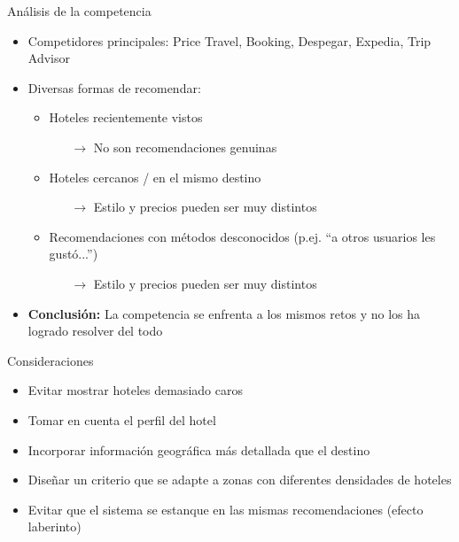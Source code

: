 \documentclass{beamer}
\begin{document}
\begin{frame}{Análisis de la competencia}
	\begin{itemize}%
		\item Competidores principales: Price Travel, Booking, Despegar, Expedia, Trip Advisor
		\item Diversas formas de recomendar:
		\begin{itemize}
			\item Hoteles recientemente vistos
			\begin{itemize}
				\item[$\rightarrow$] No son recomendaciones genuinas
			\end{itemize}
			\item Hoteles cercanos / en el mismo destino
			\begin{itemize}
				\item[$\rightarrow$] Estilo y precios pueden ser muy distintos
			\end{itemize}
			\item Recomendaciones con métodos desconocidos (p.ej. ``a otros usuarios les gustó...'')
			\begin{itemize}
				\item[$\rightarrow$] Estilo y precios pueden ser muy distintos
			\end{itemize}
		\end{itemize}
	\item \textbf{Conclusión:} La competencia se enfrenta a los mismos retos y no los ha logrado resolver del todo
	\end{itemize}
\end{frame}

\begin{frame}{Consideraciones}
	\begin{itemize}%
		\item Evitar mostrar hoteles demasiado caros
		\item Tomar en cuenta el perfil del hotel
		\item Incorporar información geográfica más detallada que el destino
		\item Diseñar un criterio que se adapte a zonas con diferentes densidades de hoteles
		\item Evitar que el sistema se estanque en las mismas recomendaciones (efecto laberinto)
	\end{itemize}
\end{frame}
\end{document}
